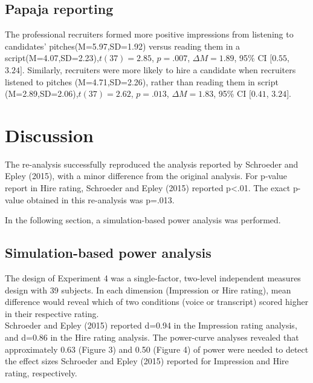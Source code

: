 \documentclass[
  english,
  man]{apa6}
\begin{document}
\hypertarget{papaja-reporting}{%
\subsection{Papaja reporting}\label{papaja-reporting}}

The professional recruiters formed more positive impressions from listening to candidates' pitches(M=5.97,SD=1.92) versus reading them in a script(M=4.07,SD=2.23),\(t(37) = 2.85\), \(p = .007\), \(\Delta M = 1.89\), 95\% CI \([0.55\), \(3.24]\). Similarly, recruiters were more likely to hire a candidate when recruiters listened to pitches (M=4.71,SD=2.26), rather than reading them in script (M=2.89,SD=2.06),\(t(37) = 2.62\), \(p = .013\), \(\Delta M = 1.83\), 95\% CI \([0.41\), \(3.24]\).

\hypertarget{discussion}{%
\section{Discussion}\label{discussion}}

The re-analysis successfully reproduced the analysis reported by Schroeder and Epley (2015), with a minor difference from the original analysis. For p-value report in Hire rating, Schroeder and Epley (2015) reported p\textless.01. The exact p-value obtained in this re-analysis was p=.013.

In the following section, a simulation-based power analysis was performed.

\hypertarget{simulation-based-power-analysis}{%
\subsection{Simulation-based power analysis}\label{simulation-based-power-analysis}}

The design of Experiment 4 was a single-factor, two-level independent measures design with 39 subjects. In each dimension (Impression or Hire rating), mean difference would reveal which of two conditions (voice or transcript) scored higher in their respective rating.\\
Schroeder and Epley (2015) reported d=0.94 in the Impression rating analysis, and d=0.86 in the Hire rating analysis. The power-curve analyses revealed that approximately 0.63 (Figure 3) and 0.50 (Figure 4) of power were needed to detect the effect sizes Schroeder and Epley (2015) reported for Impression and Hire rating, respectively.
\end{document}
